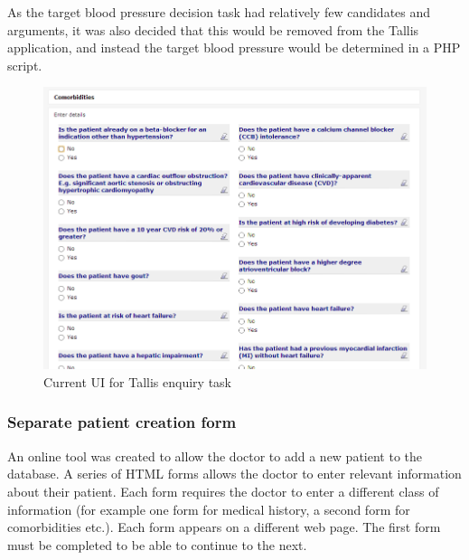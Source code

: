 \documentclass[11pt]{article}
\begin{document}
As the target blood pressure decision task had relatively few candidates and arguments, it was also decided that this would be removed from the Tallis application, and instead the target blood pressure would be determined in a PHP script.

\begin{figure}[ht]
\begin{center}
\includegraphics[scale=0.7]{Tallis_UI_unsuitable}
\caption{Current UI for Tallis enquiry task}
\label{fig:Tallis_UI_unsuitable}
\end{center}
\end{figure}

\subsubsection{Separate patient creation form}

An online tool was created to allow the doctor to add a new patient to the database. A series of HTML forms allows the doctor to enter relevant information about their patient. Each form requires the doctor to enter a different class of information (for example one form for medical history, a second form for comorbidities etc.). Each form appears on a different web page. The first form must be completed to be able to continue to the next.
\end{document}
